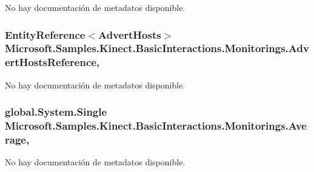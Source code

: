 No hay documentación de metadatos disponible. 

\hypertarget{class_microsoft_1_1_samples_1_1_kinect_1_1_basic_interactions_1_1_monitorings_a1397a331dd739f51b07eccb667eb50dd}{
\subsubsection[{Advert\-Hosts\-Reference}]{\setlength{\rightskip}{0pt plus 5cm}Entity\-Reference$<${\bf Advert\-Hosts}$>$ Microsoft.\-Samples.\-Kinect.\-Basic\-Interactions.\-Monitorings.\-Advert\-Hosts\-Reference\hspace{0.3cm}{\ttfamily [get]}, {\ttfamily [set]}}}\label{class_microsoft_1_1_samples_1_1_kinect_1_1_basic_interactions_1_1_monitorings_a1397a331dd739f51b07eccb667eb50dd}


No hay documentación de metadatos disponible. 

\hypertarget{class_microsoft_1_1_samples_1_1_kinect_1_1_basic_interactions_1_1_monitorings_a1290a5c6f6eeb1ad9fa356bea431bd06}{
\subsubsection[{Average}]{\setlength{\rightskip}{0pt plus 5cm}global.\-System.\-Single Microsoft.\-Samples.\-Kinect.\-Basic\-Interactions.\-Monitorings.\-Average\hspace{0.3cm}{\ttfamily [get]}, {\ttfamily [set]}}}\label{class_microsoft_1_1_samples_1_1_kinect_1_1_basic_interactions_1_1_monitorings_a1290a5c6f6eeb1ad9fa356bea431bd06}


No hay documentación de metadatos disponible. 

